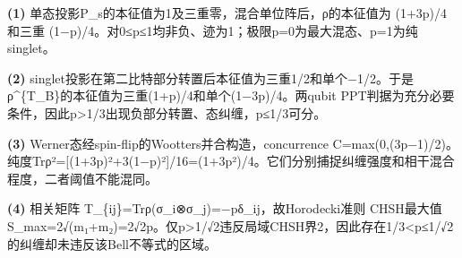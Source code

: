 \par\noindent\textbf{(1)} 单态投影P\_s的本征值为1及三重零，混合单位阵后，ρ的本征值为 (1+3p)/4 和三重 (1−p)/4。对0≤p≤1均非负、迹为1；极限p=0为最大混态、p=1为纯singlet。
\par\noindent\textbf{(2)} singlet投影在第二比特部分转置后本征值为三重1/2和单个−1/2。于是ρ\textasciicircum{}\{T\_B\}的本征值为三重(1+p)/4和单个(1−3p)/4。两qubit PPT判据为充分必要条件，因此p>1/3出现负部分转置、态纠缠，p≤1/3可分。
\par\noindent\textbf{(3)} Werner态经spin-flip的Wootters并合构造，concurrence C=max(0,(3p−1)/2)。纯度Trρ²=[(1+3p)²+3(1−p)²]/16=(1+3p²)/4。它们分别捕捉纠缠强度和相干混合程度，二者阈值不能混同。
\par\noindent\textbf{(4)} 相关矩阵 T\_\{ij\}=Trρ(σ\_i⊗σ\_j)=−pδ\_ij，故Horodecki准则 CHSH最大值 S\_max=2√(m₁+m₂)=2√2p。仅p>1/√2违反局域CHSH界2，因此存在1/3<p≤1/√2的纠缠却未违反该Bell不等式的区域。
